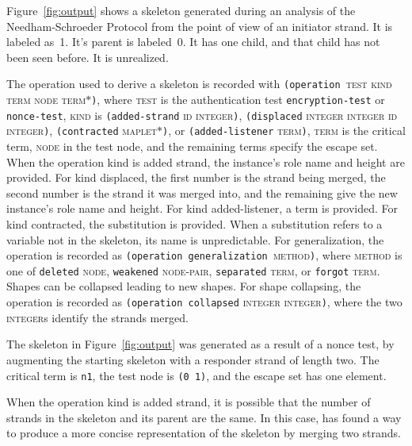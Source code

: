 \documentclass[12pt]{article}
\begin{document}
Figure~\ref{fig:output} shows a skeleton generated during an analysis
of the Needham-Schroeder Protocol from the point of view of an
initiator strand.  It is labeled as~1.  It's parent is labeled~0.  It
has one child, and that child has not been seen before.  It is
unrealized.

\label{sec:operation}
\begin{sloppypar}
The operation used to derive a skeleton is recorded with
\texttt{(operation~}\textsc{test kind term node
  term$\ast$}\texttt{)}, where \textsc{test} is the authentication
test \texttt{encryption-test} or \texttt{nonce-test}, \textsc{kind} is
\texttt{(added-strand} \textsc{id} \textsc{integer}\texttt{)},
\texttt{(displaced} \textsc{integer} \textsc{integer} \textsc{id} \textsc{integer}\texttt{)},
\texttt{(contracted} \textsc{maplet$\ast$}\texttt{)}, or
\texttt{(added-listener} \textsc{term}\texttt{)}, \textsc{term} is the
critical term, \textsc{node} in the test node, and the remaining terms
specify the escape set. When the operation kind is added strand, the
instance's role name and height are provided.
For kind displaced, the first number is the strand being merged, the
second number is the strand it was merged into, and the remaining give
the new instance's role name and height.
For kind added-listener,
a term is provided. For kind contracted, the substitution is
provided. When a substitution refers to a variable not in the
skeleton, its name is unpredictable. For generalization, the operation
is recorded as
\texttt{(operation~generalization~}\textsc{method}\texttt{)}, where
\textsc{method} is one of \texttt{deleted} \textsc{node},
\texttt{weakened} \textsc{node-pair}, \texttt{separated}
\textsc{term}, or \texttt{forgot} \textsc{term}.  Shapes can be
collapsed leading to new shapes.  For shape collapsing, the operation
is recorded as \texttt{(operation~collapsed} \textsc{integer}
\textsc{integer}\texttt{)}, where the two \textsc{integer}s identify
the strands merged.
\end{sloppypar}

The skeleton in Figure~\ref{fig:output} was generated as a result of a
nonce test, by augmenting the starting skeleton with a responder
strand of length two.  The critical term is \texttt{n1}, the test
node is \texttt{(0~1)}, and the escape set has one element.

When the operation kind is added strand, it is possible that the
number of strands in the skeleton and its parent are the same.  In
this case, {\cpsa} has found a way to produce a more concise
representation of the skeleton by merging two strands.
\end{document}
